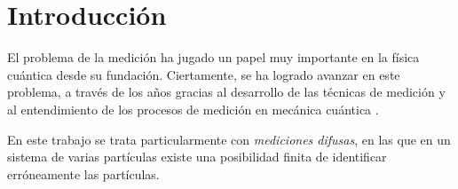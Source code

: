 \chapter*{Introducción}

El problema de la medición ha jugado un papel muy importante en la física
cuántica desde su fundación. Ciertamente, se ha logrado avanzar en este
problema, a través de los años gracias al desarrollo de las técnicas de
medición y al entendimiento de los procesos de medición en mecánica cuántica
{\cite{Pineda_2021}}. 

En este trabajo se trata particularmente con \textit{mediciones difusas}, en las
que en un sistema de varias partículas existe una posibilidad finita de
identificar erróneamente las partículas. 



